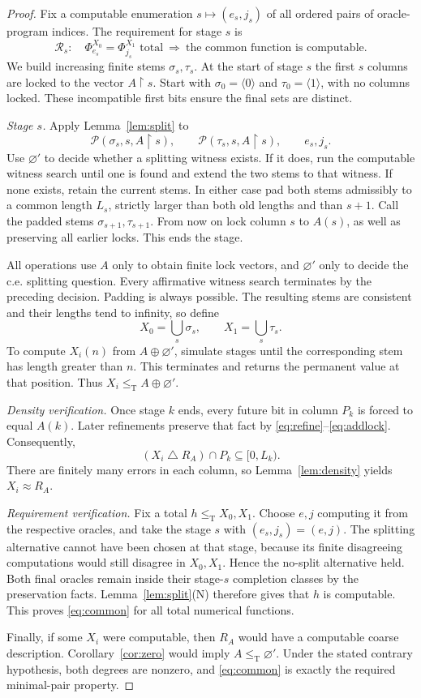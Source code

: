 \documentclass[11pt,a4paper]{article}
\newcommand{\leT}{\leq_{\mathrm T}}
\newcommand{\Pcond}{\mathcal P}
\newcommand{\restr}{\mathbin{\upharpoonright}}
\theoremstyle{definition}\newtheorem{definition}[theorem]{Definition}
\theoremstyle{remark}\newtheorem{remark}[theorem]{Remark}
\begin{document}
\begin{proof}
Fix a computable enumeration $s\mapsto(e_s,j_s)$ of all ordered pairs of oracle-program indices. The requirement for stage $s$ is
\[
 \mathcal R_s:\quad
 \Phi_{e_s}^{X_0}=\Phi_{j_s}^{X_1}\text{ total}
 \ \Longrightarrow\ \text{the common function is computable}.
\]
We build increasing finite stems $\sigma_s,\tau_s$. At the start of stage $s$ the first $s$ columns are locked to the vector $A\restr s$. Start with $\sigma_0=\langle0\rangle$ and $\tau_0=\langle1\rangle$, with no columns locked. These incompatible first bits ensure the final sets are distinct.

\emph{Stage $s$.} Apply Lemma~\ref{lem:split} to
\[
 \Pcond(\sigma_s,s,A\restr s),\qquad
 \Pcond(\tau_s,s,A\restr s),\qquad e_s,j_s.
\]
Use $\varnothing'$ to decide whether a splitting witness exists. If it does, run the computable witness search until one is found and extend the two stems to that witness. If none exists, retain the current stems. In either case pad both stems admissibly to a common length $L_s$, strictly larger than both old lengths and than $s+1$. Call the padded stems $\sigma_{s+1},\tau_{s+1}$. From now on lock column $s$ to $A(s)$, as well as preserving all earlier locks. This ends the stage.

All operations use $A$ only to obtain finite lock vectors, and $\varnothing'$ only to decide the c.e. splitting question. Every affirmative witness search terminates by the preceding decision. Padding is always possible. The resulting stems are consistent and their lengths tend to infinity, so define
\[
 X_0=\bigcup_s\sigma_s,\qquad X_1=\bigcup_s\tau_s.
\]
To compute $X_i(n)$ from $A\oplus\varnothing'$, simulate stages until the corresponding stem has length greater than $n$. This terminates and returns the permanent value at that position. Thus $X_i\leT A\oplus\varnothing'$.

\emph{Density verification.} Once stage $k$ ends, every future bit in column $P_k$ is forced to equal $A(k)$. Later refinements preserve that fact by \eqref{eq:refine}--\eqref{eq:addlock}. Consequently,
\[
 (X_i\mathbin\triangle R_A)\cap P_k\subseteq[0,L_k).
\]
There are finitely many errors in each column, so Lemma~\ref{lem:density} yields $X_i\approx R_A$.

\emph{Requirement verification.} Fix a total $h\leT X_0,X_1$. Choose $e,j$ computing it from the respective oracles, and take the stage $s$ with $(e_s,j_s)=(e,j)$. The splitting alternative cannot have been chosen at that stage, because its finite disagreeing computations would still disagree in $X_0,X_1$. Hence the no-split alternative held. Both final oracles remain inside their stage-$s$ completion classes by the preservation facts. Lemma~\ref{lem:split}(N) therefore gives that $h$ is computable. This proves \eqref{eq:common} for all total numerical functions.

Finally, if some $X_i$ were computable, then $R_A$ would have a computable coarse description. Corollary~\ref{cor:zero} would imply $A\leT\varnothing'$. Under the stated contrary hypothesis, both degrees are nonzero, and \eqref{eq:common} is exactly the required minimal-pair property.
\end{proof}
\end{document}
